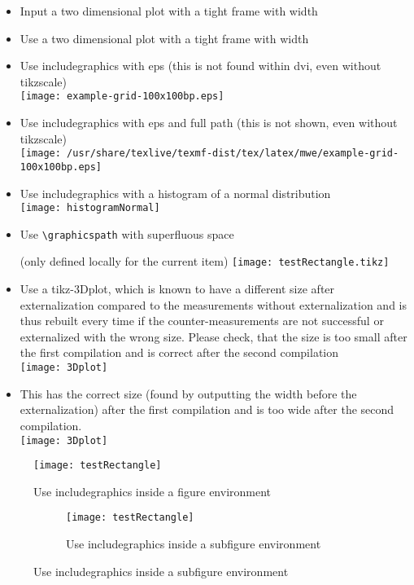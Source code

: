\documentclass[twocolumn]{article}
\begin{document}
\begin{itemize}
			\item Input a two dimensional plot with a tight frame with width \newlength{\mylen}\settowidth{\mylen}{\frame{}}\the\mylen\\%
				\frame{}
			\item Use a two dimensional plot with a tight frame with width \the\mylen\\%
		\else
			\item Use includegraphics with eps (this is not found within dvi, even without tikzscale)\\%
				\texttt{[image: example-grid-100x100bp.eps]}%
			\item Use includegraphics with eps and full path (this is not shown, even without tikzscale)\\%
				\texttt{[image: /usr/share/texlive/texmf-dist/tex/latex/mwe/example-grid-100x100bp.eps]}%
		\fi
		\item Use includegraphics with a histogram of a normal distribution\\%
			\texttt{[image: histogramNormal]}%
		\item {Use \texttt{\textbackslash graphicspath} with superfluous space\graphicspath{{somefolder} } (only defined locally for the current item)
			\texttt{[image: testRectangle.tikz]}}%
		\item Use a tikz-3Dplot, which is known to have a different size after externalization compared to the measurements without externalization and is thus rebuilt every time if the counter-measurements are not successful or externalized with the wrong size. Please check, that the size is too small after the first compilation and is correct after the second compilation\\%
			\texttt{[image: 3Dplot]}
		\item This has the correct size (found by outputting the width before the externalization) after the first compilation and is too wide after the second compilation.\\%
			\texttt{[image: 3Dplot]}
	\end{itemize}

	\begin{figure}
		\centering
		\texttt{[image: testRectangle]}%
		\caption{Use includegraphics inside a figure environment}
	\end{figure}
	\begin{figure}
		\begin{subfigure}{\linewidth}
			\centering
			\texttt{[image: testRectangle]}%
			\caption{Use includegraphics inside a subfigure environment}
		\end{subfigure}
	\end{figure}
\end{document}
